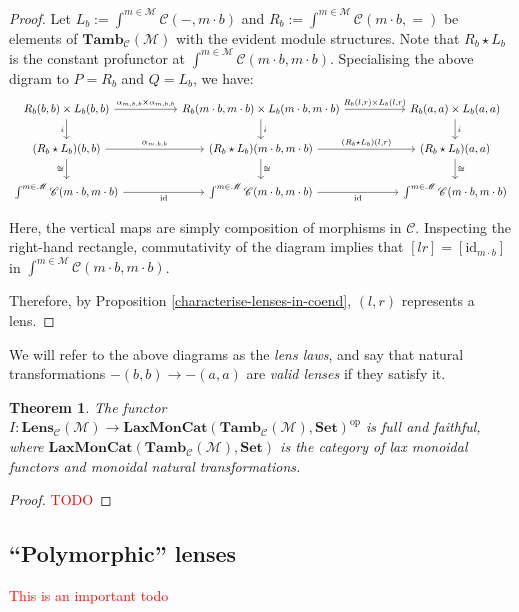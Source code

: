 \documentclass[11pt,a4paper]{amsart}
\theoremstyle{plain}
\newtheorem{theorem}{Theorem}[section]
\theoremstyle{definition}
\newcommand{\id}{\mathrm{id}}
\newcommand{\C}{\mathscr{C}}
\newcommand{\M}{\mathscr{M}}
\newcommand{\Set}{\mathbf{Set}}
\newcommand{\LaxMonCat}{\mathbf{LaxMonCat}}
\newcommand{\Lens}{\mathbf{Lens}}
\newcommand{\Tamb}{\mathbf{Tamb}}
\newcommand{\op}{\mathrm{op}}
\newcommand{\todo}[1]{\textcolor{red}{\small #1}}
\begin{document}
\begin{proof}
Let $L_b := \int^{m \in \M} \C(-,m\cdot b)$ and $R_b := \int^{m \in \M} \C(m\cdot b,=)$ be elements of $\Tamb_\C(\M)$ with the evident module structures. Note that $R_b \star L_b$ is the constant profunctor at $\int^{m\in \M} \C(m \cdot b, m \cdot b)$. Specialising the above digram to $P = R_b$ and $Q = L_b$, we have:
\[
\begin{tikzcd}[column sep=huge]
R_b(b, b) \times L_b(b, b) \ar[d, "i" left ] \ar[r, "\alpha_{m,b,b} \times \alpha_{m,b,b}" above] & R_b(m\cdot b, m\cdot b) \times L_b(m\cdot b, m\cdot b) \ar[d, "i"] \ar[r, "{R_b(l, r)\times L_b(l, r)}" above] & R_b(a, a) \times L_b(a, a) \ar[d, "i"] \\
(R_b\star L_b)(b, b) \ar[r, "\alpha_{m,b,b}" above] \ar[d, "\cong" left] & (R_b\star L_b)(m\cdot b, m\cdot b) \ar[r, "{(R_b\star L_b)(l,r)}" above] \ar[d, "\cong" right] & (R_b\star L_b)(a, a) \ar[d, "\cong" right]\\
\int^{m\in \M} \C(m \cdot b, m \cdot b) \ar[r, "\id" below] & \int^{m\in \M} \C(m \cdot b, m \cdot b) \ar[r, "\id" below] & \int^{m\in \M} \C(m \cdot b, m \cdot b)
\end{tikzcd}
\] 

Here, the vertical maps are simply composition of morphisms in $\C$. Inspecting the right-hand rectangle, commutativity of the diagram implies that $[lr] = [\id_{m\cdot b}]$ in $\int^{m\in \M} \C(m \cdot b, m \cdot b)$. 

Therefore, by Proposition \ref{characterise-lenses-in-coend}, $(l,r)$ represents a lens.
\end{proof}


We will refer to the above diagrams as the \emph{lens laws}, and say that natural transformations $-(b, b) \to -(a, a)$ are \emph{valid lenses} if they satisfy it.

\begin{theorem}
The functor $I : \Lens_\C(\M) \to \LaxMonCat(\Tamb_\C(\M), \Set)^\op$ is full and faithful, where $\LaxMonCat(\Tamb_\C(\M), \Set)$ is the category of lax monoidal functors and monoidal natural transformations.
\end{theorem}
\begin{proof}
\todo{TODO}
\end{proof}

\subsection{``Polymorphic'' lenses}

\todo{This is an important todo}
\end{document}

